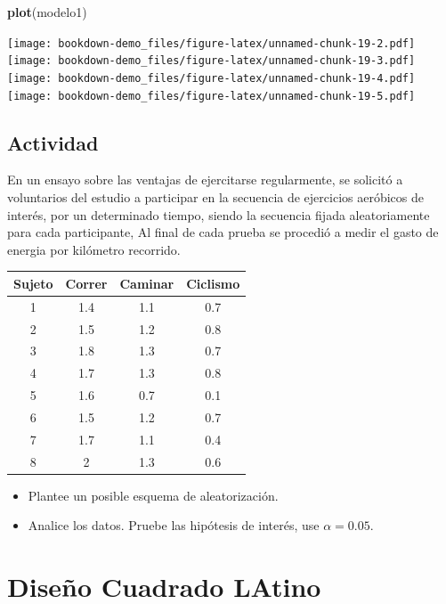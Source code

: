\documentclass[]{book}
\newenvironment{Shaded}{\begin{snugshade}}{\end{snugshade}}
\newcommand{\KeywordTok}[1]{\textcolor[rgb]{0.13,0.29,0.53}{\textbf{#1}}}
\newcommand{\NormalTok}[1]{#1}
\providecommand{\tightlist}{%
  \setlength{\itemsep}{0pt}\setlength{\parskip}{0pt}}
\begin{document}
\begin{Shaded}
\begin{Highlighting}[]
\KeywordTok{plot}\NormalTok{(modelo1)}
\end{Highlighting}
\end{Shaded}

\texttt{[image: bookdown-demo\_files/figure-latex/unnamed-chunk-19-2.pdf]}
\texttt{[image: bookdown-demo\_files/figure-latex/unnamed-chunk-19-3.pdf]}
\texttt{[image: bookdown-demo\_files/figure-latex/unnamed-chunk-19-4.pdf]}
\texttt{[image: bookdown-demo\_files/figure-latex/unnamed-chunk-19-5.pdf]}

\section{Actividad}\label{actividad-3}

En un ensayo sobre las ventajas de ejercitarse regularmente, se solicitó
a voluntarios del estudio a participar en la secuencia de ejercicios
aeróbicos de interés, por un determinado tiempo, siendo la secuencia
fijada aleatoriamente para cada participante, Al final de cada prueba se
procedió a medir el gasto de energia por kilómetro recorrido.

\begin{longtable}[]{@{}cccc@{}}
\toprule
Sujeto & Correr & Caminar & Ciclismo\tabularnewline
\midrule
\endhead
1 & 1.4 & 1.1 & 0.7\tabularnewline
2 & 1.5 & 1.2 & 0.8\tabularnewline
3 & 1.8 & 1.3 & 0.7\tabularnewline
4 & 1.7 & 1.3 & 0.8\tabularnewline
5 & 1.6 & 0.7 & 0.1\tabularnewline
6 & 1.5 & 1.2 & 0.7\tabularnewline
7 & 1.7 & 1.1 & 0.4\tabularnewline
8 & 2 & 1.3 & 0.6\tabularnewline
\bottomrule
\end{longtable}

\begin{itemize}
\tightlist
\item
  Plantee un posible esquema de aleatorización.\\
\item
  Analice los datos. Pruebe las hipótesis de interés, use
  \(\alpha=0.05\).
\end{itemize}

\chapter{Diseño Cuadrado LAtino}\label{diseno-cuadrado-latino}
\end{document}
